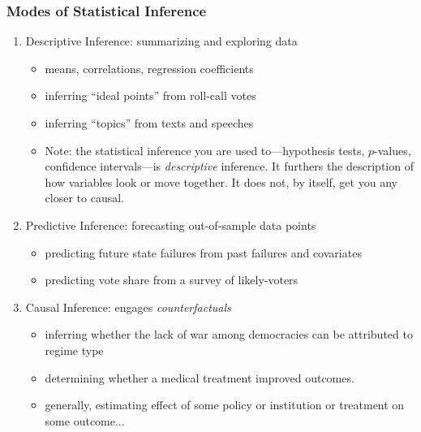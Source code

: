\documentclass[handout,xcolor=dvipsnames,pdftex,hyperref={colorlinks=false}]{beamer}
\begin{document}
\begin{frame}
\frametitle{Modes of Statistical Inference}
  \begin{enumerate}
  \item[1.] Descriptive Inference: summarizing and exploring data
    \begin{itemize}
    \item means, correlations, regression coefficients
    \item inferring ``ideal points'' from roll-call votes
    \item inferring ``topics'' from texts and speeches
    \item Note: the statistical inference you are used to---hypothesis tests, $p$-values, confidence intervals---is \textit{descriptive} inference. It furthers the description of how variables look or move together. It does not, by itself, get you any closer to causal.
    \end{itemize}
    \medskip \pause
  \item[2.] Predictive Inference: forecasting out-of-sample data
    points
    \begin{itemize}
    \item predicting future state failures from past failures and covariates
    \item predicting vote share from a survey of likely-voters
   \end{itemize}

    \medskip \pause
  \item[3.] \alert{Causal Inference}: engages {\it counterfactuals}
    \begin{itemize}
    \item inferring whether the lack of war among democracies can be attributed to regime type
    \item determining whether a medical treatment improved outcomes.
    \item generally, estimating effect of some policy or institution or treatment on some outcome...
    \end{itemize}
  \end{enumerate}

\end{frame}
\end{document}

